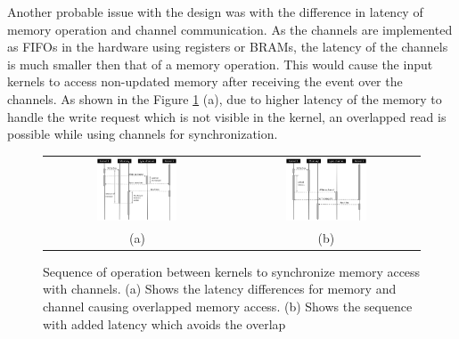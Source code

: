 Another probable issue with the design was with the difference in latency of memory operation
and channel communication. As the channels are implemented as FIFOs in the hardware
using registers or BRAMs, the latency of the channels is much smaller then that of a memory
operation. This would cause the input kernels to access non-updated memory after receiving the
event over the channels. As shown in the Figure \ref{fig:memchan_latency} (a), due to higher latency
of the memory to handle the write request which is not visible in the kernel, an overlapped
read is possible while using channels for synchronization.
\begin{figure}[h]
	\centering\small
	\begin{tabular}{c|c}
    \includegraphics[width=0.45\textwidth]{images/memchan_latency} & \includegraphics[width=0.45\textwidth]{images/resolved_latency}\\
    (a) & (b)
	\end{tabular}
    \caption{Sequence of operation between kernels to synchronize memory
    access with channels. (a) Shows the latency differences for memory and
    channel causing overlapped memory access. (b) Shows the sequence with
    added latency which avoids the overlap}
	\label{fig:memchan_latency}
\end{figure}

